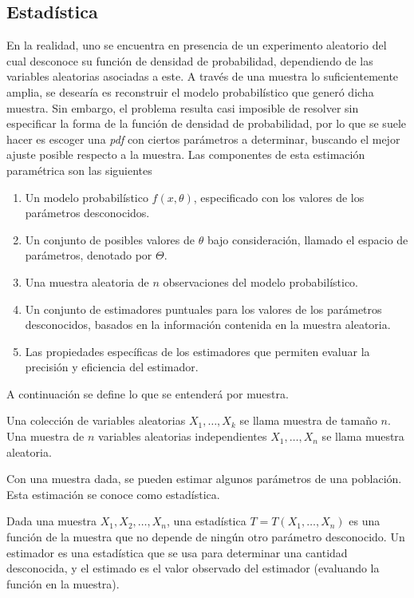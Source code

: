 	\subsection{Estadística}
		En la realidad, uno se encuentra en presencia de un experimento aleatorio del cual desconoce su función de densidad de probabilidad, dependiendo de las variables aleatorias asociadas a este. A través de una muestra lo suficientemente amplia, se desearía es reconstruir el modelo probabilístico que generó dicha muestra. Sin embargo, el problema resulta casi imposible de resolver sin especificar la forma de la función de densidad de probabilidad, por lo que se suele hacer es escoger una \textit{pdf} con ciertos parámetros a determinar, buscando el mejor ajuste posible respecto a la muestra. Las componentes de esta estimación paramétrica son las siguientes \cite{rossi_2018}
		\begin{enumerate}
			\item Un modelo probabilístico $f(x,\theta)$, especificado con los valores de los parámetros desconocidos.
			\item Un conjunto de posibles valores de $\theta$ bajo consideración, llamado el espacio de parámetros, denotado por $\Theta$.
			\item Una muestra aleatoria de $n$ observaciones del modelo probabilístico.
			\item Un conjunto de estimadores puntuales para los valores de los parámetros desconocidos, basados en la información contenida en la muestra aleatoria.
			\item Las propiedades específicas de los estimadores que permiten evaluar la precisión y eficiencia del estimador.
		\end{enumerate}
		A continuación se define lo que se entenderá por muestra.
		\begin{defi}[Muestra]
			Una colección de variables aleatorias $X_1,\dots,X_k$ se llama muestra de tamaño $n$. Una muestra de $n$ variables aleatorias independientes $X_1,\dots,X_n$ se llama muestra aleatoria.
		\end{defi}
		Con una muestra dada, se pueden estimar algunos parámetros de una población. Esta estimación se conoce como estadística.
		
		\begin{defi}
			Dada una muestra $X_1,X_2,\dots,X_n$, una estadística $T=T(X_1,\dots,X_n)$ es una función de la muestra que no depende de ningún otro parámetro desconocido. Un estimador es una estadística que se usa para determinar una cantidad desconocida, y el estimado es el valor observado del estimador (evaluando la función en la muestra).
		\end{defi}
		
